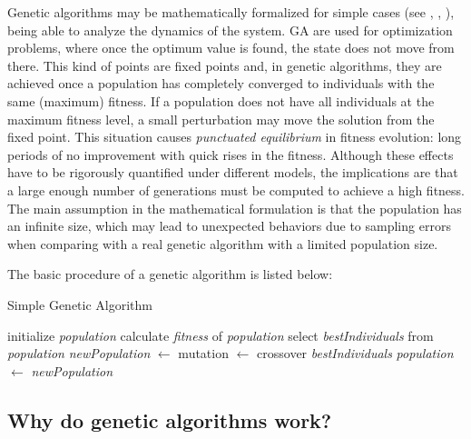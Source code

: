     \newpage
    
    Genetic algorithms may be mathematically formalized for simple cases (see \cite{goldberg2006genetic}, \cite{vose1991punctuated}, \cite{whitley1993executable}), being able to analyze the dynamics of the system. GA are used for optimization problems, where once the optimum value is found, the state does not move from there. This kind of points are fixed points and, in genetic algorithms, they are achieved once a population has completely converged to individuals with the same (maximum) fitness. If a population does not have all individuals at the maximum fitness level, a small perturbation may move the solution from the fixed point. This situation causes \textit{punctuated equilibrium} in fitness evolution: long periods of no improvement with quick rises in the fitness. Although these effects have to be rigorously quantified under different models, the implications are that a large enough number of generations must be computed to achieve a high fitness. The main assumption in the mathematical formulation is that the population has an infinite size, which may lead to unexpected behaviors due to sampling errors when comparing with a real genetic algorithm with a limited population size. 
    
    The basic procedure of a genetic algorithm is listed below:
    \begin{algorithm}
        \caption{Simple Genetic Algorithm}\label{alg:simpleGApseudoCode}
        \begin{algorithmic}[1]
        \State initialize \textit{population}
            \State calculate \textit{fitness} of \textit{population}
            \State select \textit{bestIndividuals} from \textit{population}
            \State \textit{newPopulation} $\leftarrow$ mutation $\leftarrow$ crossover \textit{bestIndividuals}
            \State \textit{population} $\leftarrow$ \textit{newPopulation}
        \EndWhile
        \end{algorithmic}
    \end{algorithm}

\subsection{Why do genetic algorithms work?}

